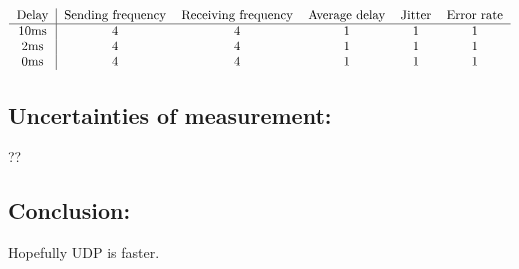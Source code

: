 \begin{center}
	$\begin{tabular}{c|ccccc}
		Delay & \text{Sending frequency} & \text{Receiving frequency} & \text{Average delay} & Jitter & \text{Error rate}\\
		\hline
		10ms & 4 & 4 & 1 & 1 & 1 \\
		2ms & 4 & 4 & 1 & 1 & 1 \\
		0ms & 4 & 4 & 1 & 1 & 1 \\
	\end{tabular}$
\end{center}


\subsection*{Uncertainties of measurement:}

??

\subsection*{Conclusion:}

Hopefully UDP is faster.
